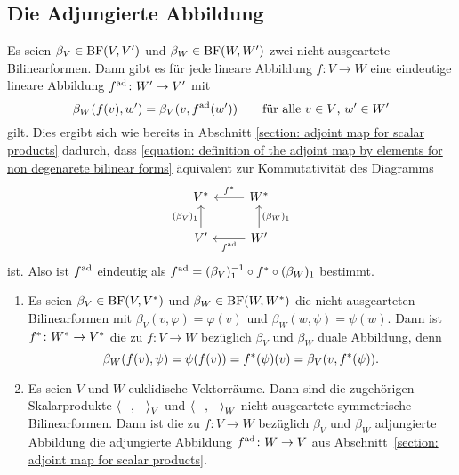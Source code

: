 \subsection{Die Adjungierte Abbildung}

Es seien $\beta_V \in \operatorname{BF}(V,V')$ und $\beta_W \in \operatorname{BF}(W,W')$ zwei nicht-ausgeartete Bilinearformen.
Dann gibt es für jede lineare Abbildung $f \colon V \to W$ eine eindeutige lineare Abbildung $f^{\operatorname{ad}} \colon W' \to V'$ mit
\begin{equation}
  \label{equation: definition of the adjoint map by elements for non degenarete bilinear forms}
    \beta_W(f(v), w')
  = \beta_V(v, f^{\operatorname{ad}}(w'))
  \qquad
  \text{für alle $v \in V$, $w' \in W'$}
\end{equation}
gilt.
Dies ergibt sich wie bereits in Abschnitt \ref{section: adjoint map for scalar products} dadurch, dass \eqref{equation: definition of the adjoint map by elements for non degenarete bilinear forms} äquivalent zur Kommutativität des Diagramms
\[
  \begin{tikzcd}
      \dual{V}
    & \dual{W}
      \arrow[swap]{l}{\dual{f}}
    \\
      V'
      \arrow{u}{(\beta_V)_1}
    & W'
      \arrow[swap]{u}{(\beta_W)_1}
      \arrow{l}{\adj{f}}
  \end{tikzcd}
\]
ist.
Also ist $f^{\operatorname{ad}}$ eindeutig als $f^{\operatorname{ad}} = (\beta_V)_1^{-1} \circ f^* \circ (\beta_W)_1$ bestimmt.

\begin{example}
  \leavevmode
  \begin{enumerate}
    \item
      Es seien $\beta_V \in \operatorname{BF}(V, V^*)$ und $\beta_W \in \operatorname{BF}(W, W^*)$ die nicht-ausgearteten Bilinearformen mit $\beta_V(v, \varphi) = \varphi(v)$ und $\beta_W(w, \psi) = \psi(w)$.
      Dann ist $f^* \colon W^* \to V^*$ die zu $f \colon V \to W$ bezüglich $\beta_V$ und $\beta_W$ duale Abbildung, denn
      \[
          \beta_W(f(v), \psi)
        = \psi(f(v))
        = f^*(\psi)(v)
        = \beta_V(v, f^*(\psi)).
      \]
    \item
      Es seien $V$ und $W$ euklidische Vektorräume.
      Dann sind die zugehörigen Skalarprodukte $\left\langle -, - \right\rangle_V$ und $\left\langle -, - \right\rangle_W$ nicht-ausgeartete symmetrische Bilinearformen.
      Dann ist die zu $f \colon V \to W$ bezüglich $\beta_V$ und $\beta_W$ adjungierte Abbildung die adjungierte Abbildung $f^{\operatorname{ad}} \colon W \to V$ aus Abschnitt~\ref{section: adjoint map for scalar products}.
  \end{enumerate}
\end{example}



